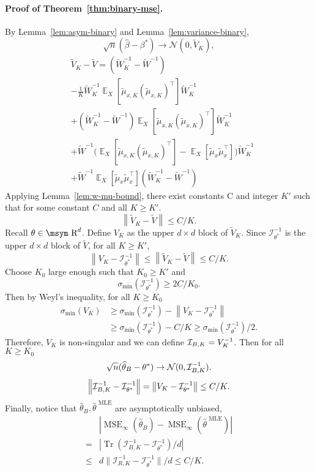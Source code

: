 \documentclass[11pt,a4paper]{article}
\newcommand{\reals}{\mbox{\msym R}}
\DeclareMathOperator{\E}{\mathbb{E}}
\newcommand{\mse}{\operatorname{MSE}}
\newcommand{\tr}{\operatorname{Tr}}
\newcommand{\wt}[1]{\widetilde{#1}}
\newcommand{\wh}[1]{\widehat{#1}}
\newcommand{\mle}{\wh{\theta}^{\text{~MLE}}}
\newcommand{\vbk}{\wt{V}_{K}}
\newcommand{\vb}{\wt{V}}
\newcommand{\wbk}{\wt{W}_{K}}
\newcommand{\wb}{\wt{W}}
\newcommand{\mubxk}{\wt{\mu}_{x, K}}
\newcommand{\mubx}{\wt{\mu}_{x}}
\newcommand{\vnorm}[1]{\left\| #1 \right\|}
\newcommand{\fisher}{\mathcal{I}_{\theta^*}}
\begin{document}
\paragraph{Proof of Theorem~\ref{thm:binary-mse}.} By Lemma~\ref{lem:asym-binary} and Lemma~\ref{lem:variance-binary}, 
\[
\sqrt{n}(\wh{\beta} - \beta^*)\rightarrow \mathcal{N}(0, \vbk),
\]
\begin{equation*}
\begin{aligned}
& \vbk  - \vb = \left(\wbk^{-1} - \wb^{-1}\right)  \\
& - \frac{1}{K}\wbk^{-1}\E_X \left[\mubxk (\mubxk)^\top\right]\wbk^{-1} \\
& + \left(\wbk^{-1} - \wb^{-1}\right)\E_X \left[\mubxk (\mubxk)^\top\right]\wbk^{-1}  \\
& + \wb^{-1}\Big( \E_X \left[\mubxk (\mubxk)^\top\right] - \E_X \left[\mubx\mubx^\top\right] \Big) \wbk^{-1}\\
& + \wb^{-1}\E_X \left[\mubx\mubx^\top\right] \left(\wbk^{-1} - \wb^{-1}\right)
\end{aligned}
\end{equation*}
Applying Lemma~\ref{lem:w-mu-bound}, there exist constants C and integer $K'$ such that for some constant $C$ and all $K \geq K'$.
\[
\vnorm{\vbk - \vb} \leq C/K.
\]
Recall $\theta\in\reals^d$. Define $V_K$ as the upper $d\times d$ block of $\vbk$. Since $\fisher^{-1}$ is the upper $d\times d$ block of $\vb$, for all $K \geq K'$,
\[
\vnorm{V_K - \fisher^{-1}} \leq \vnorm{\vbk - \vb} \leq C / K.
\]
Choose $K_0$ large enough such that $K_0 \geq K'$ and 
\[
\sigma_{\min}(\fisher^{-1}) \geq 2C/K_0.
\]
Then by Weyl's inequality, for all $K\geq K_0$
\begin{equation*}
\begin{aligned}
\sigma_{\min}(V_K) & \geq \sigma_{\min}(\fisher^{-1}) - \vnorm{V_K - \fisher^{-1}}   \\
& \geq \sigma_{\min}(\fisher^{-1}) - C/K  \geq \sigma_{\min}(\fisher^{-1})/2. 
\end{aligned}
\end{equation*}
Therefore, $V_K$ is non-singular and we can define ${\cal I}_{B, K} = V_K^{-1}$. Then for all $K\geq K_0$
\[
\sqrt{n}(\wh{\theta}_B - \theta^*)\rightarrow \mathcal{N}(0, {\cal I}_{B, K}^{-1}).
\]
\[
\vnorm{{\cal I}_{B, K}^{-1} - \fisher^{-1}} = \vnorm{V_K - \fisher^{-1}}  \leq C / K.
\]
Finally, notice that $\wh{\theta}_B, \mle$ are asymptotically unbiased, 
\begin{equation*}
\begin{aligned}
  & |\mse_{\infty} (\wh{\theta}_B) -  \mse_{\infty} (\mle)|  \\
= & |\tr(\mathcal{I}_{B, K}^{-1} - \fisher^{-1})/d| \\
\leq & d \|\mathcal{I}_{R, K}^{-1} - \fisher^{-1}\|/d \leq C/ K.
\end{aligned}
\end{equation*} 

\clearpage{}
\end{document}

